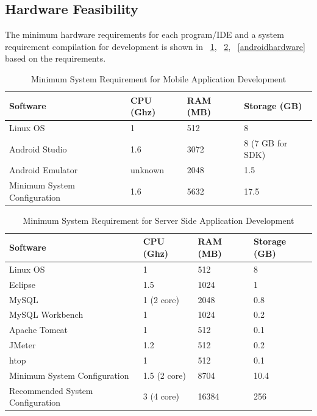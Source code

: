 \subsection{Hardware Feasibility}
The minimum hardware requirements for each program/IDE and
a system requirement compilation for development is shown in ~\ref{minreqmobile}, ~\ref{minreqserver}, ~\ref{androidhardware} based on the requirements.

\begin{table}[!ht]
\centering
\caption{Minimum System Requirement for Mobile Application Development}
\label{minreqmobile}
\begin{tabular}{|l|l|l|l|}
\hline
\textbf{Software}& \textbf{CPU (Ghz)} & \textbf{RAM (MB)}  & \textbf{Storage (GB)} \\ \hline
Linux OS \cite{linuxMinimumSystemRequirements} & \hfill 1 & \hfill 512 & \hfill 8 \\ \hline
Android Studio \cite{androidMinimumSystemRequirements} & \hfill 1.6 & \hfill 3072  & \hfill 8 (7 GB for SDK)\\ \hline
Android Emulator \cite{androidMinimumSystemRequirements} & \hfill unknown & \hfill 2048 & \hfill 1.5 \\ \hline
Minimum System Configuration & \hfill 1.6 & \hfill 5632 & \hfill 17.5 \\ \hline
\end{tabular}
\end{table}

\begin{table}[!ht]
\centering
\caption{Minimum System Requirement for Server Side Application Development}
\label{minreqserver}
\begin{tabular}{|l|l|l|l|}
\hline
\textbf{Software}& \textbf{CPU (Ghz)} & \textbf{RAM (MB)}  & \textbf{Storage (GB)} \\ \hline
Linux OS \cite{linuxMinimumSystemRequirements} & \hfill 1 & \hfill 512 & \hfill 8 \\ \hline
Eclipse \cite{eclipse} & \hfill 1.5 & \hfill 1024  & \hfill 1  \\ \hline
MySQL \cite{mysql} & \hfill 1 (2 core) & \hfill 2048 & \hfill 0.8 \\ \hline
MySQL Workbench\cite{mySQLWorkTanim} & \hfill 1 & \hfill 1024 & \hfill 0.2 \\ \hline
Apache Tomcat\cite{TomcatTanim} & \hfill 1 & \hfill 512 & \hfill 0.1 \\ \hline
JMeter\cite{JMeterTanim} & \hfill 1.2 & \hfill 512 & \hfill 0.2 \\ \hline
htop\cite{htopTanim} & \hfill 1 & \hfill 512 & \hfill 0.1 \\ \hline
Minimum System Configuration & \hfill 1.5 (2 core) & \hfill 8704 & \hfill 10.4 \\ \hline
Recommended System Configuration & \hfill 3 (4 core) & \hfill 16384 & \hfill 256 \\ \hline
\end{tabular}
\end{table}

